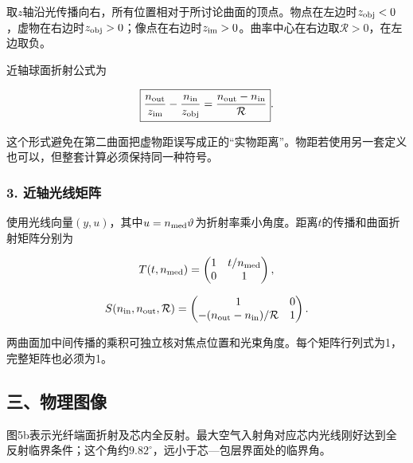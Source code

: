 \documentclass[12pt,a4paper,fontset=fandol]{ctexart}
\begin{document}
取\(z\)轴沿光传播向右，所有位置相对于所讨论曲面的顶点。物点在左边时\(z_{\rm obj}<0\)，虚物在右边时\(z_{\rm obj}>0\)；像点在右边时\(z_{\rm im}>0\)。曲率中心在右边取\(\mathcal R>0\)，在左边取负。

近轴球面折射公式为

\[
\boxed{
\frac{n_{\rm out}}{z_{\rm im}}
-\frac{n_{\rm in}}{z_{\rm obj}}
=\frac{n_{\rm out}-n_{\rm in}}{\mathcal R}}.
\]

这个形式避免在第二曲面把虚物距误写成正的``实物距离''。物距若使用另一套定义也可以，但整套计算必须保持同一种符号。

\subsubsection{3.
近轴光线矩阵}\label{ux8fd1ux8f74ux5149ux7ebfux77e9ux9635}

使用光线向量\((y,u)\)，其中\(u=n_{\rm med}\vartheta\)为折射率乘小角度。距离\(t\)的传播和曲面折射矩阵分别为

\[
T(t,n_{\rm med})=
\begin{pmatrix}1&t/n_{\rm med}\\0&1\end{pmatrix},
\]

\[
S(n_{\rm in},n_{\rm out},\mathcal R)=
\begin{pmatrix}
1&0\\
-(n_{\rm out}-n_{\rm in})/\mathcal R&1
\end{pmatrix}.
\]

两曲面加中间传播的乘积可独立核对焦点位置和光束角度。每个矩阵行列式为1，完整矩阵也必须为1。

\subsection{三、物理图像}\label{ux4e09ux7269ux7406ux56feux50cf-4}

图5b表示光纤端面折射及芯内全反射。最大空气入射角对应芯内光线刚好达到全反射临界条件；这个角约\(9.82^\circ\)，远小于芯---包层界面处的临界角。
\end{document}
